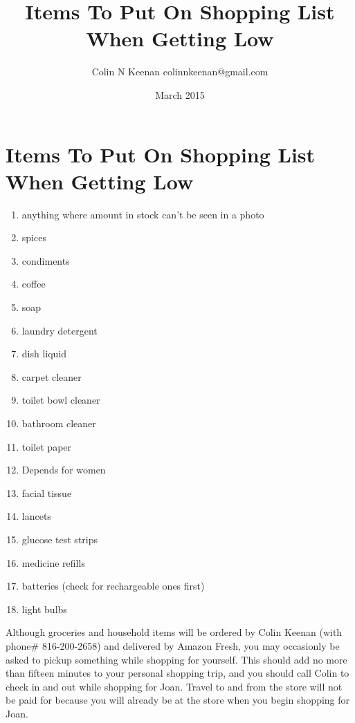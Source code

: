 \documentclass[12pt,letterpaper]{article}
\newcommand{\mytitle}{Items To Put On Shopping List When Getting Low}
\begin{document}
\title{\mytitle{}}
\author{Colin N Keenan colinnkeenan@gmail.com}
\date{March 2015}
\section*{\mytitle{}}
\begin{enumerate}
	\item anything where amount in stock can't be seen in a photo
	\item spices
	\item condiments
	\item coffee
	\item soap
	\item laundry detergent
	\item dish liquid
	\item carpet cleaner
	\item toilet bowl cleaner
	\item bathroom cleaner
	\item toilet paper
	\item Depends for women
	\item facial tissue
	\item lancets
	\item glucose test strips
	\item medicine refills
	\item batteries (check for rechargeable ones first)
	\item light bulbs
\end{enumerate}
Although groceries and household items will be ordered by Colin Keenan (with phone\# 816-200-2658) and delivered by Amazon Fresh, you may occasionly be asked to pickup something while shopping for yourself. This should add no more than fifteen minutes to your personal shopping trip, and you should call Colin to check in and out while shopping for Joan. Travel to and from the store will not be paid for because you will already be at the store when you begin shopping for Joan. 
\end{document}
